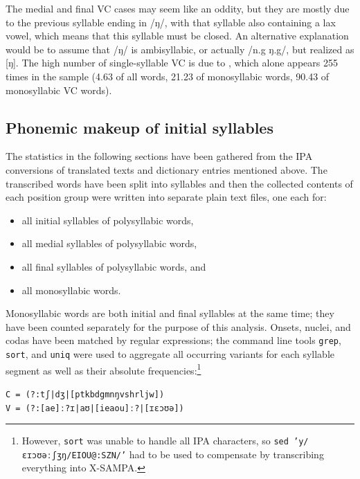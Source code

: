%
The medial and final VC cases may seem like an oddity, but they are mostly due
to the previous syllable ending in /ŋ/, with that syllable also containing a
lax vowel, which means that this syllable must be closed. An alternative
explanation would be to assume that /ŋ/ is ambisyllabic, or actually /n.g%
\til{}ŋ.g/, but realized as [ŋ].\label{ŋ} The high number of 
single-syllable VC is due to , which alone appears 255 
times in the sample (4.63\pct{} of all words, 21.23\pct{} of monosyllabic 
words, 90.43\pct{} of monosyllabic VC words).


\subsection{Phonemic makeup of initial syllables}

%
The statistics in the following sections have been gathered from the IPA 
conversions of translated texts and dictionary entries mentioned above. The 
transcribed words have been split into syllables and then the collected 
contents 
of each position group were written into separate plain text files, one each 
for:

\begin{itemize}
	\item all initial syllables of polysyllabic words,
	\item all medial syllables of polysyllabic words,
	\item all final syllables of polysyllabic words, and 
	\item all monosyllabic words.
\end{itemize}

Monosyllabic words are both initial and final syllables at the same time; they 
have been counted separately for the purpose of this analysis. Onsets, nuclei, 
and codas have been matched by regular expressions; the com\-mand line tools 
\texttt{grep}, \texttt{sort}, and \texttt{uniq} were used to aggregate all 
occurring variants for each syllable segment as well as their absolute 
frequencies:\footnote{However, \texttt{sort} was unable to handle all IPA 
characters, so \texttt{sed 'y/ɛɪɔʊəːʃʒŋ/EIOU@:SZN/'} had to be used to 
compensate by transcribing everything into X-SAMPA.}

\ex
	\texttt{C = (?:tʃ|dʒ|[ptkbdgmnŋvshrljw])\\
	V = (?:[ae]ː?ɪ|aʊ|[ieaou]ː?|[ɪɛɔʊə])}
\xe

